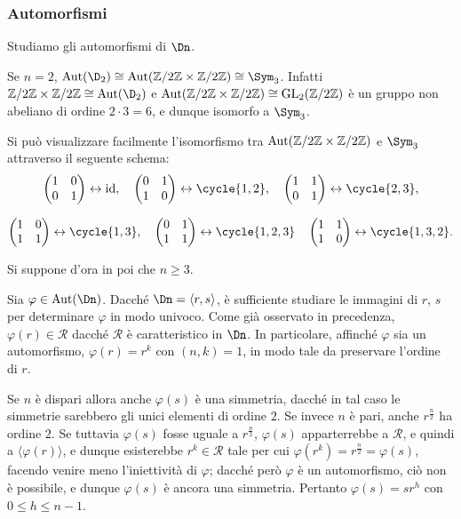 \documentclass[11pt]{scrartcl}
\begin{document}
	\subsubsection{Automorfismi}
	
	Studiamo gli automorfismi di $\Dn$. \medskip
	
	
	Se $n = 2$, $\Aut(\D_2) \cong \Aut(\Z2 \times \Z2) \cong \Sym_3$. Infatti
	$\Z2 \times \Z2 \cong \Aut(\D_2)$ e $\operatorname{Aut}(\mathbb{Z}/{2}\mathbb{Z} \times \mathbb{Z}/{2}\mathbb{Z}) \cong \operatorname{GL}_2(\mathbb{Z}/{2}\mathbb{Z})$ è
	un gruppo non abeliano di ordine $2 \cdot 3 = 6$, e dunque isomorfo a $\Sym_3$. \medskip

	Si può visualizzare facilmente l'isomorfismo
	tra $\operatorname{Aut}(\mathbb{Z}/{2}\mathbb{Z} \times \mathbb{Z}/{2}\mathbb{Z})$ e $\Sym_3$ attraverso il seguente schema:
	\[
	\begin{pmatrix}1 & 0 \\ 0 & 1\end{pmatrix} \leftrightarrow \id, \quad
	\begin{pmatrix}0 & 1 \\ 1 & 0\end{pmatrix} \leftrightarrow \cycle{1, 2}, \quad
	\begin{pmatrix}1 & 1 \\ 0 & 1\end{pmatrix} \leftrightarrow \cycle{2, 3},
	\]
	
	\[
	\begin{pmatrix}1 & 0 \\ 1 & 1\end{pmatrix} \leftrightarrow \cycle{1, 3}, \quad
	\begin{pmatrix}0 & 1 \\ 1 & 1\end{pmatrix} \leftrightarrow \cycle{1, 2, 3} \quad
	\begin{pmatrix}1 & 1 \\ 1 & 0\end{pmatrix} \leftrightarrow \cycle{1, 3, 2}.
	\] \medskip
	
	Si suppone d'ora in poi che $n \geq 3$. \medskip
 
	Sia $\varphi \in \Aut(\Dn)$. Dacché $\Dn = \langle
	r, s\rangle$, è sufficiente studiare le immagini di $r$, $s$ per determinare
	$\varphi$ in modo univoco. Come già osservato in precedenza, $\varphi(r) \in \mathcal{R}$
	dacché $\mathcal{R}$ è caratteristico in $\Dn$. In particolare, affinché $\varphi$ sia
	un automorfismo, $\varphi(r) = r^k$ con $(n, k) = 1$, in modo tale da preservare l'ordine
	di $r$. \medskip
	
	
	Se $n$ è dispari allora anche $\varphi(s)$ è una simmetria, dacché in tal
	caso le simmetrie sarebbero gli unici elementi di ordine $2$. Se invece $n$ è pari,
	anche $r^{\frac{n}{2}}$ ha ordine $2$. Se tuttavia $\varphi(s)$ fosse uguale
	a $r^{\frac{n}{2}}$, $\varphi(s)$ apparterrebbe a $\mathcal{R}$, e quindi
	a $\langle \varphi(r) \rangle$, e dunque esisterebbe $r^k \in \mathcal{R}$ tale per
	cui $\varphi(r^k) = r^{\frac{n}{2}} = \varphi(s)$, facendo venire meno l'iniettività
	di $\varphi$;
	dacché però $\varphi$ è un automorfismo, ciò non è possibile, e dunque
	$\varphi(s)$ è ancora una simmetria. Pertanto $\varphi(s) = sr^h$ con
	$0 \leq h \leq n-1$. \medskip
\end{document}
